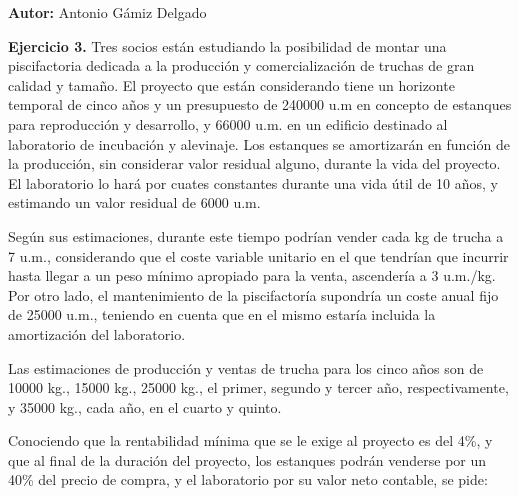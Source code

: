 \documentclass[11pt]{article}
\theoremstyle{definition}
\theoremstyle{remark}
\begin{document}
\textbf{Autor:} Antonio Gámiz Delgado

\medskip

\textbf{Ejercicio 3. } Tres socios están estudiando la posibilidad de montar una piscifactoria dedicada a la producción y comercialización de truchas de gran calidad y tamaño. El proyecto que están considerando tiene un horizonte temporal de cinco años y un presupuesto de 240000 u.m en concepto de estanques para reproducción y desarrollo, y 66000 u.m. en un edificio destinado al laboratorio de incubación y alevinaje. Los estanques se amortizarán en función de la producción, sin considerar valor residual alguno, durante la vida del proyecto. El laboratorio lo hará por cuates constantes durante una vida útil de 10 años, y estimando un valor residual de 6000 u.m.

Según sus estimaciones, durante este tiempo podrían vender cada kg de trucha a 7 u.m., considerando que el coste variable unitario en el que tendrían que incurrir hasta llegar a un peso mínimo apropiado para la venta, ascendería a 3 u.m./kg. Por otro lado, el mantenimiento de la piscifactoría supondría un coste anual fijo de 25000 u.m., teniendo en cuenta que en el mismo estaría incluida la amortización del laboratorio.

Las estimaciones de producción y ventas de trucha para los cinco años son de 10000 kg., 15000 kg., 25000 kg., el primer, segundo y tercer año, respectivamente, y 35000 kg., cada año, en el cuarto y quinto.

Conociendo que la rentabilidad mínima que se le exige al proyecto es del 4\%, y que al final de la duración del proyecto, los estanques podrán venderse por un 40\% del precio de compra, y el laboratorio por su valor neto contable, se pide:
\end{document}
